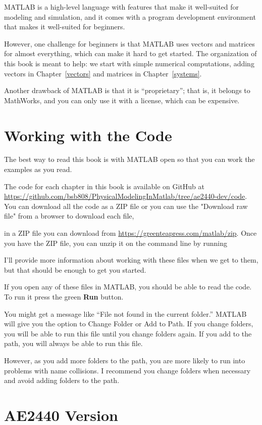 MATLAB is a high-level language with features that make it well-suited for modeling and simulation, and it comes with a program development environment that makes it well-suited for beginners.

However, one challenge for beginners is that MATLAB uses vectors and matrices for almost everything, which can make it hard to get started.  The organization of this book is meant to help: we start with simple numerical computations, adding vectors in Chapter~\ref{vectors} and matrices in Chapter~\ref{systems}.

Another drawback of MATLAB is that it is ``proprietary''; that is, it belongs to MathWorks, and you can only use it with a license, which can be expensive.

\section*{Working with the Code}

The best way to read this book is with MATLAB open so that you can work the examples as you read.  

The code for each chapter in this book is available on GitHub at \url{https://github.com/bsb808/PhysicalModelingInMatlab/tree/ae2440-dev/code}.  You can download all the code as a ZIP file or you can use the "Download raw file" from a browser to download each file,

in a ZIP file you can download from \url{https://greenteapress.com/matlab/zip}.
Once you have the ZIP file, you can unzip it on the command line by running

I'll provide more information about working with these files when we get to them, but that should be enough to get you started.

If you open any of these files in MATLAB, you should be able to read the code.  To run it press the green \textbf{Run} button.

You might get a message like ``File not found in the current folder.''
MATLAB will give you the option to Change Folder or Add to Path.  If you change folders, you will be able to run this file until you change folders again.  If you add to the path, you will always be able to run this file.

However, as you add more folders to the path, you are more likely to run into problems with name collisions.
I recommend you change folders when necessary and avoid adding folders to the path.

\section*{AE2440 Version}


